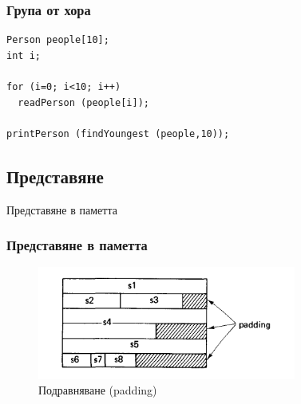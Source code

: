 \documentclass{beamer}
\begin{document}
\begin{frame}[fragile]
\frametitle{Група от хора}


\begin{lstlisting}
Person people[10];
int i;

for (i=0; i<10; i++)
  readPerson (people[i]);

printPerson (findYoungest (people,10));

\end{lstlisting}

\end{frame}


\subsection{Представяне}

\begin{frame}
\centerline{Представяне в паметта}
\end{frame}


\begin{frame}[fragile]
\frametitle{Представяне в паметта}

\begin{figure}
\includegraphics[width=8.5cm]{images/padding}
\caption{Подравняване (padding)\cite{wirth}}
\end{figure}

\end{frame}
\end{document}
